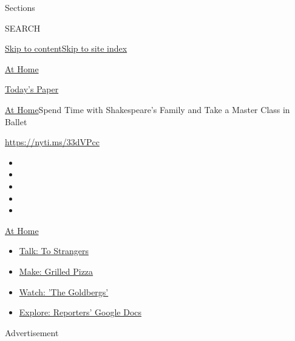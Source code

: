 Sections

SEARCH

\protect\hyperlink{site-content}{Skip to
content}\protect\hyperlink{site-index}{Skip to site index}

\href{https://www.nytimes.com/spotlight/at-home}{At Home}

\href{https://myaccount.nytimes.com/auth/login?response_type=cookie\&client_id=vi}{}

\href{https://www.nytimes.com/section/todayspaper}{Today's Paper}

\href{/spotlight/at-home}{At Home}\textbar{}Spend Time with
Shakespeare's Family and Take a Master Class in Ballet

\url{https://nyti.ms/33dVPcc}

\begin{itemize}
\item
\item
\item
\item
\item
\end{itemize}

\href{https://www.nytimes.com/spotlight/at-home?action=click\&pgtype=Article\&state=default\&region=TOP_BANNER\&context=at_home_menu}{At
Home}

\begin{itemize}
\tightlist
\item
  \href{https://www.nytimes.com/2020/08/03/well/family/the-benefits-of-talking-to-strangers.html?action=click\&pgtype=Article\&state=default\&region=TOP_BANNER\&context=at_home_menu}{Talk:
  To Strangers}
\item
  \href{https://www.nytimes.com/2020/08/01/at-home/coronavirus-make-pizza-on-a-grill.html?action=click\&pgtype=Article\&state=default\&region=TOP_BANNER\&context=at_home_menu}{Make:
  Grilled Pizza}
\item
  \href{https://www.nytimes.com/2020/07/31/arts/television/goldbergs-abc-stream.html?action=click\&pgtype=Article\&state=default\&region=TOP_BANNER\&context=at_home_menu}{Watch:
  'The Goldbergs'}
\item
  \href{https://www.nytimes.com/interactive/2020/at-home/even-more-reporters-editors-diaries-lists-recommendations.html?action=click\&pgtype=Article\&state=default\&region=TOP_BANNER\&context=at_home_menu}{Explore:
  Reporters' Google Docs}
\end{itemize}

Advertisement

